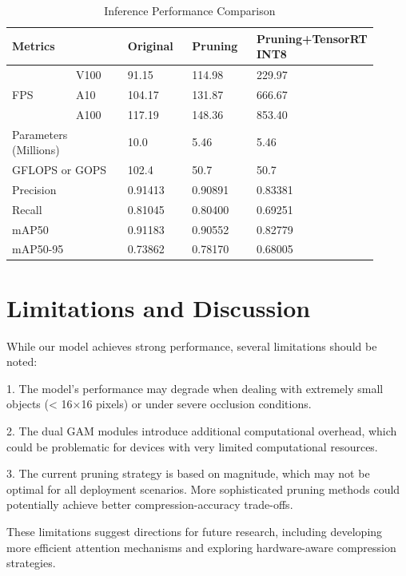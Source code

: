 \documentclass[10pt]{article}
\begin{document}
\begin{table}
\centering

\begin{tabular}{p{0.18\linewidth}p{0.15\linewidth}p{0.18\linewidth}p{0.18\linewidth}p{0.22\linewidth}}
    \hline
    Metrics &  & Original & Pruning & Pruning+TensorRT INT8 \\
    \hline
    \multirow{3}{*}{FPS} & V100 & 91.15 & 114.98 & 229.97 \\
     & A10 & 104.17 & 131.87 & 666.67 \\
     & A100 & 117.19 & 148.36 & 853.40 \\
    \hline
    \multicolumn{2}{l}{Parameters (Millions)} & 10.0 & 5.46 & 5.46 \\
    \multicolumn{2}{l}{GFLOPS or GOPS} & 102.4 & 50.7 & 50.7 \\
    \multicolumn{2}{l}{Precision} & 0.91413 & 0.90891 & 0.83381 \\
    \multicolumn{2}{l}{Recall} & 0.81045 & 0.80400 & 0.69251 \\
    \multicolumn{2}{l}{mAP50} & 0.91183 & 0.90552 & 0.82779 \\
    \multicolumn{2}{l}{mAP50-95} & 0.73862 & 0.78170 & 0.68005 \\
    \hline
    \end{tabular}
    \caption{Inference Performance Comparison}
    \label{tab:model_compression}
    \end{table}
\section{Limitations and Discussion}
    While our model achieves strong performance, several limitations should be noted:
    
    1. The model's performance may degrade when dealing with extremely small objects (< 16×16 pixels) or under severe occlusion conditions.
    
    2. The dual GAM modules introduce additional computational overhead, which could be problematic for devices with very limited computational resources.
    
    3. The current pruning strategy is based on magnitude, which may not be optimal for all deployment scenarios. More sophisticated pruning methods could potentially achieve better compression-accuracy trade-offs.
    
    These limitations suggest directions for future research, including developing more efficient attention mechanisms and exploring hardware-aware compression strategies.
\end{document}
